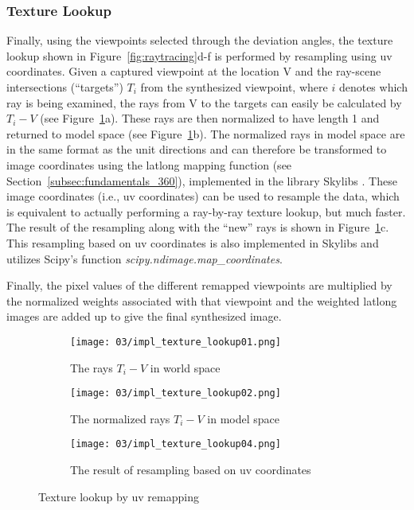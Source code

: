\subsubsection{Texture Lookup}
Finally, using the viewpoints selected through the deviation angles, the texture lookup shown in Figure~\ref{fig:raytracing}d-f is performed by resampling using uv coordinates. Given a captured viewpoint at the location V and the ray-scene intersections (``targets'') $T_i$ from the synthesized viewpoint, where $i$ denotes which ray is being examined, the rays from V to the targets can easily be calculated by $T_i-V$ (see Figure~\ref{fig:impl_texture_lookup}a). These rays are then normalized to have length 1 and returned to model space (see Figure~\ref{fig:impl_texture_lookup}b). The normalized rays in model space are in the same format as the unit directions and can therefore be transformed to image coordinates using the latlong mapping function (see Section~\ref{subsec:fundamentals_360}), implemented in the library Skylibs \cite{skylibs}. These image coordinates (i.e., uv coordinates) can be used to resample the data, which is equivalent to actually performing a ray-by-ray texture lookup, but much faster. The result of the resampling along with the ``new'' rays is shown in Figure~\ref{fig:impl_texture_lookup}c. This resampling based on uv coordinates is also implemented in Skylibs and utilizes Scipy's function \emph{scipy.ndimage.map\_coordinates}.

Finally, the pixel values of the different remapped viewpoints are multiplied by the normalized weights associated with that viewpoint and the weighted latlong images are added up to give the final synthesized image.

\begin{figure}
\centering
    \hfill
    \begin{subfigure}[t]{0.3\textwidth} \centering \texttt{[image: 03/impl\_texture\_lookup01.png]}
            \caption{The rays $T_i-V$ in world space}
    \end{subfigure}%
    \hfill
    \begin{subfigure}[t]{0.3\textwidth}
            \centering
            \texttt{[image: 03/impl\_texture\_lookup02.png]}
            \caption{The normalized rays $T_i-V$ in model space}
    \end{subfigure}
    \hfill
    \begin{subfigure}[t]{0.3\textwidth}
            \centering
            \texttt{[image: 03/impl\_texture\_lookup04.png]}
            \caption{The result of resampling based on uv coordinates}
    \end{subfigure}%
    \hfill
  \caption{Texture lookup by uv remapping} \label{fig:impl_texture_lookup}
\end{figure}

